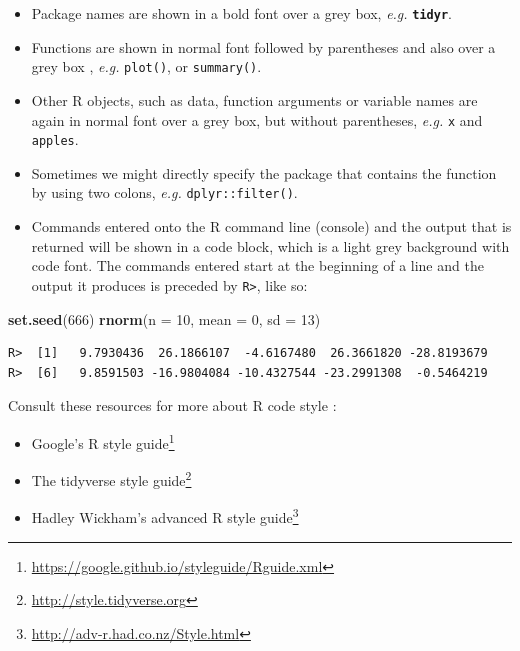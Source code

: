 \documentclass[english,10pt,a4paper,oneside]{book}
\renewcommand{\href}[2]{#2\footnote{\url{#1}}}
\let\rmarkdownfootnote\footnote%
\def\footnote{\protect\rmarkdownfootnote}
\providecommand{\tightlist}{%
  \setlength{\itemsep}{0pt}\setlength{\parskip}{0pt}}
\newenvironment{Shaded}{\begin{snugshade}}{\end{snugshade}}
\newcommand{\DataTypeTok}[1]{\textcolor[rgb]{0.13,0.29,0.53}{#1}}
\newcommand{\DecValTok}[1]{\textcolor[rgb]{0.00,0.00,0.81}{#1}}
\newcommand{\KeywordTok}[1]{\textcolor[rgb]{0.13,0.29,0.53}{\textbf{#1}}}
\newcommand{\NormalTok}[1]{#1}
\theoremstyle{definition}
\theoremstyle{definition}
\theoremstyle{definition}
\theoremstyle{remark}
\begin{document}
\begin{itemize}
\tightlist
\item
  Package names are shown in a bold font over a grey box, \emph{e.g.}
  \textbf{\texttt{tidyr}}.
\item
  Functions are shown in normal font followed by parentheses and also
  over a grey box , \emph{e.g.} \texttt{plot()}, or \texttt{summary()}.
\item
  Other R objects, such as data, function arguments or variable names
  are again in normal font over a grey box, but without parentheses,
  \emph{e.g.} \texttt{x} and \texttt{apples}.
\item
  Sometimes we might directly specify the package that contains the
  function by using two colons, \emph{e.g.} \texttt{dplyr::filter()}.
\item
  Commands entered onto the R command line (console) and the output that
  is returned will be shown in a code block, which is a light grey
  background with code font. The commands entered start at the beginning
  of a line and the output it produces is preceded by
  \texttt{R\textgreater{}}, like so:
\end{itemize}

\begin{Shaded}
\begin{Highlighting}[]
\KeywordTok{set.seed}\NormalTok{(}\DecValTok{666}\NormalTok{)}
\KeywordTok{rnorm}\NormalTok{(}\DataTypeTok{n =} \DecValTok{10}\NormalTok{, }\DataTypeTok{mean =} \DecValTok{0}\NormalTok{, }\DataTypeTok{sd =} \DecValTok{13}\NormalTok{)}
\end{Highlighting}
\end{Shaded}

\begin{verbatim}
R>  [1]   9.7930436  26.1866107  -4.6167480  26.3661820 -28.8193679
R>  [6]   9.8591503 -16.9804084 -10.4327544 -23.2991308  -0.5464219
\end{verbatim}

Consult these resources for more about R code style :

\begin{itemize}
\tightlist
\item
  \href{https://google.github.io/styleguide/Rguide.xml}{Google's R style
  guide}
\item
  \href{http://style.tidyverse.org}{The tidyverse style guide}
\item
  \href{http://adv-r.had.co.nz/Style.html}{Hadley Wickham's advanced R
  style guide}
\end{itemize}
\end{document}

